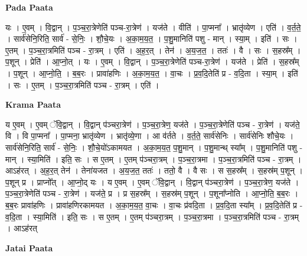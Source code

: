 \documentclass[17pt]{extarticle}
\begin{document}
\textbf{Pada Paata} \newline

यः । ए॒वम् । वि॒द्वान् । प॒ञ्च॒रा॒त्रेणेति॑ पञ्च-रा॒त्रेण॑ । यज॑ते । वीति॑ । पा॒प्मना᳚ । भ्रातृ॑व्येण । एति॑ । व॒र्त॒ते॒ । सार्व॑सेनि॒रिति॒ सार्व॑ - से॒निः॒ । शौ॒चे॒यः । अ॒का॒म॒य॒त॒ । प॒शु॒मानिति॑ पशु - मान् । स्या॒म् । इति॑ । सः । ए॒तम् । प॒ञ्च॒रा॒त्रमिति॑ पञ्च - रा॒त्रम् । एति॑ । अ॒ह॒र॒त् । तेन॑ । अ॒य॒ज॒त॒ । ततः॑ । वै । सः । स॒हस्र᳚म् । प॒शून् । प्रेति॑ । आ॒प्नो॒त् । यः । ए॒वम् । वि॒द्वान् । प॒ञ्च॒रा॒त्रेणेति॑ पञ्च-रा॒त्रेण॑ । यज॑ते । प्रेति॑ । स॒हस्र᳚म् । प॒शून् । आ॒प्नो॒ति॒ । ब॒ब॒रः । प्रावा॑हणिः । अ॒का॒म॒य॒त॒ । वा॒चः । प्र॒व॒दि॒तेति॑ प्र - व॒दि॒ता । स्या॒म् । इति॑ । सः । ए॒तम् । प॒ञ्च॒रा॒त्रमिति॑ पञ्च - रा॒त्रम् । एति॑ ।  \newline


\textbf{Krama Paata} \newline

य ए॒वम् । ए॒वम् ॅवि॒द्वान् । वि॒द्वान् प॑ञ्चरा॒त्रेण॑ । प॒ञ्च॒रा॒त्रेण॒ यज॑ते । प॒ञ्च॒रा॒त्रेणेति॑ पञ्च - रा॒त्रेण॑ । यज॑ते॒ वि । वि पा॒प्मना᳚ । पा॒प्मना॒ भ्रातृ॑व्येण । भ्रातृ॑व्ये॒णा । आ व॑र्तते । व॒र्त॒ते॒ सार्व॑सेनिः । सार्व॑सेनिः शौचे॒यः । सार्व॑सेनि॒रिति॒ सार्व॑ - से॒निः॒ । शौ॒चे॒यो॑ऽकामयत । अ॒का॒म॒य॒त॒ प॒शु॒मान् । प॒शु॒मान्थ् स्या᳚म् । प॒शु॒मानिति॑ पशु - मान् । स्या॒मिति॑ । इति॒ सः । स ए॒तम् । ए॒तम् प॑ञ्चरा॒त्रम् । प॒ञ्च॒रा॒त्रमा । प॒ञ्च॒रा॒त्रमिति॑ पञ्च - रा॒त्रम् । आऽह॑रत् । अ॒ह॒र॒त् तेन॑ । तेना॑यजत । अ॒य॒ज॒त॒ ततः॑ । ततो॒ वै । वै सः । स स॒हस्र᳚म् । स॒हस्र॑म् प॒शून् । प॒शून् प्र । प्राप्नो᳚त् । आ॒प्नो॒द् यः । य ए॒वम् । ए॒वम् ॅवि॒द्वान् । वि॒द्वान् प॑ञ्चरा॒त्रेण॑ । प॒ञ्च॒रा॒त्रेण॒ यज॑ते । प॒ञ्च॒रा॒त्रेणेति॑ पञ्च - रा॒त्रेण॑ । यज॑ते॒ प्र । प्र स॒हस्र᳚म् । स॒हस्र॑म् प॒शून् । प॒शूना᳚प्नोति । आ॒प्नो॒ति॒ ब॒ब॒रः । ब॒ब॒रः प्रावा॑हणिः । प्रावा॑हणिरकामयत । अ॒का॒म॒य॒त॒ वा॒चः । वा॒चः प्र॑वदि॒ता । प्र॒व॒दि॒ता स्या᳚म् । प्र॒व॒दि॒तेति॑ प्र - व॒दि॒ता । स्या॒मिति॑ । इति॒ सः । स ए॒तम् । ए॒तम् प॑ञ्चरा॒त्रम् । प॒ञ्च॒रा॒त्रमा । प॒ञ्च॒रा॒त्रमिति॑ पञ्च - रा॒त्रम् । आऽह॑रत् \newline

\textbf{Jatai Paata} \newline
\end{document}
